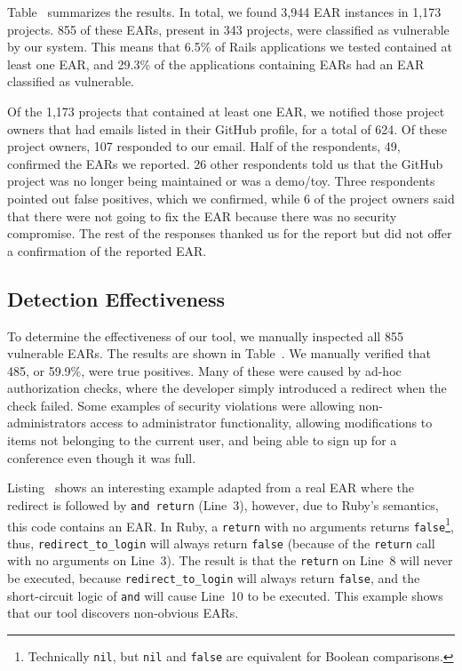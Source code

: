 Table~ summarizes the results. In total, we
found 3,944 EAR instances in 1,173 projects. 855 of these EARs,
present in 343 projects, were classified as vulnerable by our system. This means
that 6.5\% of Rails applications we tested contained at least one EAR,
and 29.3\% of the applications containing EARs had an EAR classified as
vulnerable.

Of the 1,173 projects that contained at least one EAR, we notified those
project owners that had emails listed in their GitHub profile, for a total
of 624. Of these project owners, 107 responded to our email. Half of the
respondents, 49, confirmed the EARs we reported. 26 other respondents told
us that the GitHub project was no longer being maintained or was a
demo/toy. Three respondents pointed out false positives, which we
confirmed, while 6 of the project owners said that there were not going to
fix the EAR because there was no security compromise. The rest of the
responses thanked us for the report but did not offer a confirmation of the
reported EAR. 

\subsection{Detection Effectiveness}


To determine the effectiveness of our tool, we manually inspected all
855 vulnerable EARs. The results are shown in
Table~. We manually verified that 485, or
59.9\%, were true positives. Many of these were caused by ad-hoc
authorization checks, where the developer simply introduced a redirect
when the check failed. Some examples of security violations 
were allowing non-administrators access to administrator
functionality, allowing modifications to items not belonging to the
current user, and being able to sign up for a conference even though
it was full.



Listing~ shows
an interesting example adapted from a real EAR where the redirect is followed by \texttt{and return} (Line~3),
however, due to Ruby's semantics, this code contains an EAR. In Ruby,
a \texttt{return} with no arguments returns \texttt{false}\footnote{Technically
  \texttt{nil}, but \texttt{nil} and \texttt{false} are equivalent for
  Boolean comparisons.}, 
thus, \texttt{redirect\_to\_login} will always return \texttt{false} (because of
the \texttt{return} call with no arguments on Line~3). The result is that the
\texttt{return} on Line~8 will never be executed, because
\texttt{redirect\_to\_login} will always return \texttt{false}, and
the short-circuit logic of \texttt{and} will cause Line~10 to be
executed. This example shows that our tool discovers non-obvious EARs.

